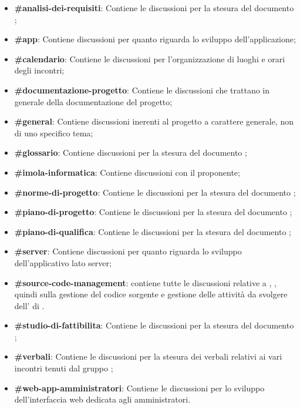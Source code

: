 \begin{itemize}
	\item \textbf{\#analisi-dei-requisiti}: Contiene le discussioni per la stesura del documento \AdR{};
	\item \textbf{\#app}: Contiene discussioni per quanto riguarda lo sviluppo dell'applicazione;
	\item \textbf{\#calendario}: Contiene le discussioni per l’organizzazione di luoghi e orari degli incontri;
	\item \textbf{\#documentazione-progetto}: Contiene le discussioni che trattano in generale della documentazione del progetto;
	\item \textbf{\#general}: Contiene discussioni inerenti al progetto a carattere generale, non di uno specifico tema;
	\item \textbf{\#glossario}: Contiene discussioni per la stesura del documento \Glossario{};
	\item \textbf{\#imola-informatica}: Contiene discussioni con il proponente;
	\item \textbf{\#norme-di-progetto}: Contiene le discussioni per la stesura del documento \NdP{};
	\item \textbf{\#piano-di-progetto}: Contiene le discussioni per la stesura del documento \PdP{};
	\item \textbf{\#piano-di-qualifica}: Contiene le discussioni per la stesura del documento \PdQ{};
	\item \textbf{\#server}: Contiene discussioni per quanto riguarda lo sviluppo dell'applicativo lato server;
	\item \textbf{\#source-code-management}: contiene tutte le discussioni relative a , , quindi sulla gestione del codice sorgente e gestione delle attività da svolgere dell' di .
	\item \textbf{\#studio-di-fattibilita}: Contiene le discussioni per la stesura del documento \SdF{};
	\item \textbf{\#verbali}: Contiene le discussioni per la stesura dei verbali relativi ai vari incontri tenuti dal gruppo \Gruppo{};
	\item \textbf{\#web-app-amministratori}: Contiene le discussioni per lo sviluppo dell'interfaccia web dedicata agli amministratori.
\end{itemize}

